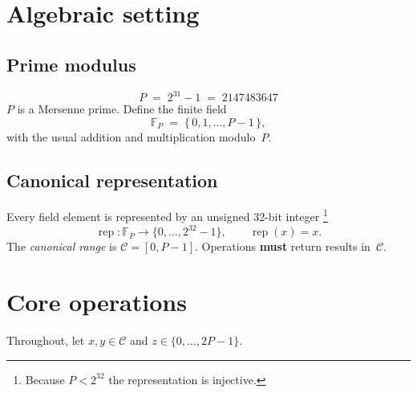 \documentclass{article}
\begin{document}
\section{Algebraic setting}

\subsection{Prime modulus}
\[
  P \;=\; 2^{31}-1 \;=\; 2147483647
\]
$P$ is a Mersenne prime.  
Define the finite field
\[
  \mathbb{F}_{P} \;=\; \{\,0,1,\dots,P-1 \,\},
\]
with the usual addition and multiplication modulo~$P$.

\subsection{Canonical representation}
Every field element is represented by an unsigned
32-bit integer%
\footnote{Because $P<2^{32}$ the representation is injective.}
\[
   \operatorname{rep}\colon\mathbb{F}_{P}\longrightarrow\{0,\dots,2^{32}-1\},
   \qquad \operatorname{rep}(x)=x.
\]
The \emph{canonical range} is
$
  \mathcal{C}= [0,P-1].
$
Operations \textbf{must} return results in~$\mathcal{C}$.

\vspace{-0.25\baselineskip}
\section{Core operations}

Throughout, let $x,y\in\mathcal{C}$ and $z\in\{0,\dots,2P-1\}$.
\end{document}
